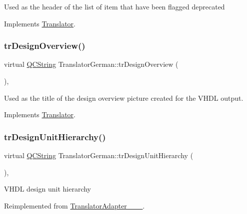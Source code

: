 Used as the header of the list of item that have been flagged deprecated 

Implements \mbox{\hyperlink{class_translator}{Translator}}.

\mbox{\label{class_translator_german_aabb0798fc4f61a997152d4d9ff943991}} 
\subsubsection{\texorpdfstring{trDesignOverview()}{trDesignOverview()}}
{\footnotesize\ttfamily virtual \mbox{\hyperlink{class_q_c_string}{Q\+C\+String}} Translator\+German\+::tr\+Design\+Overview (\begin{DoxyParamCaption}{ }\end{DoxyParamCaption})\hspace{0.3cm}{\ttfamily [inline]}, {\ttfamily [virtual]}}

Used as the title of the design overview picture created for the V\+H\+DL output. 

Implements \mbox{\hyperlink{class_translator}{Translator}}.

\mbox{\label{class_translator_german_a7b653aded20e89a5d96f937619923c64}} 
\subsubsection{\texorpdfstring{trDesignUnitHierarchy()}{trDesignUnitHierarchy()}}
{\footnotesize\ttfamily virtual \mbox{\hyperlink{class_q_c_string}{Q\+C\+String}} Translator\+German\+::tr\+Design\+Unit\+Hierarchy (\begin{DoxyParamCaption}{ }\end{DoxyParamCaption})\hspace{0.3cm}{\ttfamily [inline]}, {\ttfamily [virtual]}}

V\+H\+DL design unit hierarchy 

Reimplemented from \mbox{\hyperlink{class_translator_adapter__1__8__15}{Translator\+Adapter\+\_\+\_\+\_}}.

\mbox{\label{class_translator_german_a0d6d09616c72d7a4b8c476a3ebab58a9}} 

